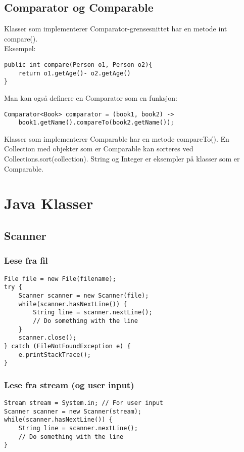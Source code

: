 \documentclass{article}
\begin{document}
\subsection{Comparator og Comparable}
Klasser som implementerer Comparator-grensesnittet har en metode int compare().\\Eksempel:
\begin{verbatim}
public int compare(Person o1, Person o2){
    return o1.getAge()- o2.getAge()
}
\end{verbatim}
Man kan også definere en Comparator som en funksjon:
\begin{verbatim}
Comparator<Book> comparator = (book1, book2) ->
    book1.getName().compareTo(book2.getName());
\end{verbatim}
Klasser som implementerer Comparable har en metode compareTo(). En Collection med objekter som er Comparable kan sorteres ved Collections.sort(collection). String og Integer er eksempler på klasser som er Comparable. 


\section{Java Klasser}

\subsection{Scanner}
\subsubsection{Lese fra fil}
\begin{verbatim}
File file = new File(filename);
try {
    Scanner scanner = new Scanner(file);
    while(scanner.hasNextLine()) {
        String line = scanner.nextLine();
        // Do something with the line
    }
    scanner.close();
} catch (FileNotFoundException e) {
    e.printStackTrace();
}
\end{verbatim}

\subsubsection{Lese fra stream (og user input)}
\begin{verbatim}
Stream stream = System.in; // For user input
Scanner scanner = new Scanner(stream);
while(scanner.hasNextLine()) {
    String line = scanner.nextLine();
    // Do something with the line
}
\end{verbatim}
\end{document}
